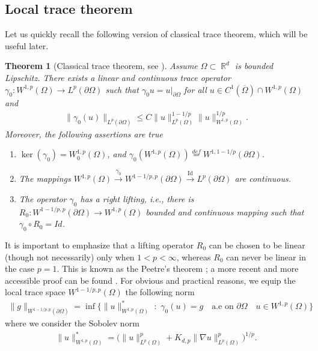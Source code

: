 \documentclass[12pt, reqno]{amsart}%
\theoremstyle{plain}  %
\newtheorem{theorem}{Theorem}[section]
\theoremstyle{definition}  %
\numberwithin{equation}{section}
\DeclareMathOperator{\R}{\mathbb{R}}
\begin{document}
\subsection{Local trace theorem}
Let us quickly recall the following version of classical trace theorem, which will be useful  later.
 \begin{theorem}[{Classical trace theorem, see \cite[Chap III]{BF13}}]\label{thm:trace-loc-thm}
Assume $\Omega\subset \R^d$ is bounded Lipschitz. There exists a linear and continuous trace operator $\gamma_0: W^{1,p}(\Omega)\to L^p(\partial\Omega)$ such that  $\gamma_0 u= u|_{\partial\Omega}$ for all $u\in C^1(\overline{\Omega})\cap W^{1,p}(\Omega)$  and
\begin{align*}
\|\gamma_0(u)\|_{ L^p(\partial \Omega)}\leq C\|u\|^{1-1/p}_{L^p(\Omega)}
\|u\|^{1/p}_{W^{1,p}(\Omega)}.
\end{align*}
Moreover, the following assertions are true
\begin{enumerate}[$(a)$]
\item  $ \ker(\gamma_0 ) = W^{1,p}_0(\Omega)$, and  $\gamma_0 (W^{1,p}(\Omega))\overset{def}{=} W^{1,1-1/p }(\partial \Omega)$.
\item The mappings $W^{1,p}(\Omega) \xrightarrow{\gamma_0}W^{1-1/p ,p}(\partial\Omega)
\xrightarrow{\operatorname{Id}} L^p(\partial \Omega)$
are continuous.
\item The operator $\gamma_0$ has a right  lifting, i.e., there is $R_0:W^{1-1/p ,p}(\partial\Omega)\to W^{1,p}(\Omega)$ bounded and continuous mapping such that $ \gamma_0\circ R_0= Id$.
\end{enumerate}
\end{theorem}
\noindent It is important to emphasize that a lifting operator $ R_0 $ can be chosen to be linear (though not necessarily) only when
$1 < p < \infty $, whereas $R_0$ can never be linear in the case $ p = 1$. This is known as the Peetre's theorem \cite{Pee79}; a more  recent and more accessible proof can be found \cite{PeWo02}. For obvious and  practical reasons, we equip the local trace space $W^{1-1/p ,p}(\Omega)$  the following norm
\begin{align*}
\|g\|_{W^{1-1/p ,p}(\partial \Omega)}= \inf\big\{ \|u\|^*_{W^{1,p}(\Omega)} \,\,:\,\, \gamma_0(u)= g\quad \text{a.e on $\partial \Omega$}\quad u\in W^{1,p}(\Omega)\big\}
\end{align*}
where we consider the Sobolev norm
\begin{align*}
\|u\|^*_{W^{1,p}(\Omega)} =\Big(\|u\|^p_{L^p(\Omega)}+ K_{d,p}\|\nabla u\|^p_{L^p(\Omega)}\Big)^{1/p}.
\end{align*}
\end{document}
